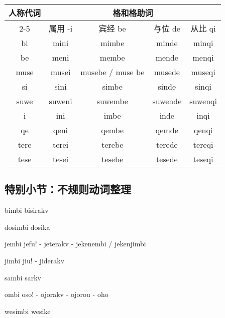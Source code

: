 \begin{center}
    \begin{tabular}{c|c|c|c|c}
        \toprule
        \multirow{3}{*}{人称代词} & \multicolumn{4}{c}{格和格助词} \\
        \cline{2-5}
            & 属用 -i & 宾经 be & 与位 de & 从比 qi\\
        \midrule
        bi & mini & mimbe & minde & minqi \\
        be & meni & membe & mende & menqi \\
        \hline
        muse & musei & musebe / muse be & musede & museqi \\
        \hline
        si & sini & simbe & sinde & sinqi \\
        suwe & suweni & suwembe & suwende & suwenqi \\
        \hline
        i & ini & imbe & inde & inqi \\
        qe & qeni & qembe & qemde & qenqi \\
        \hline
        tere & terei & terebe & terede & tereqi \\
        tese & tesei & tesebe & tesede & teseqi \\
        \bottomrule
    \end{tabular}
\end{center}

\subsection{特别小节：不规则动词整理}

\begin{des}
    \item[bimbi] bisirakv 
    \item[dosimbi] dosika 
    \item[jembi] jefu! - jeterakv - jekenembi / jekenjimbi
    \item[jimbi] jiu! - jiderakv
    \item[sambi] sarkv 
    \item[ombi] oso! - ojorakv - ojorou - oho
    \item[wesimbi] wesike 
\end{des}
